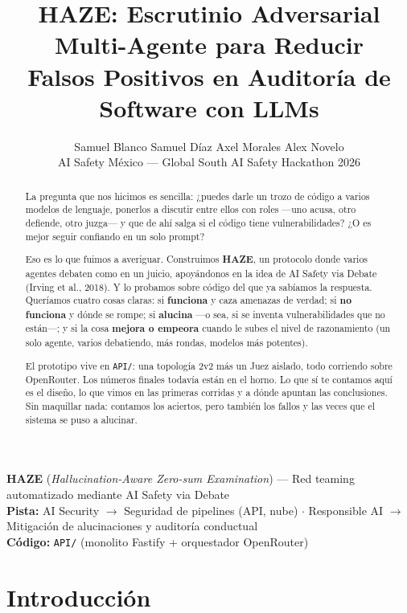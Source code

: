 \documentclass[10pt]{article}
\title{\textbf{HAZE: Escrutinio Adversarial Multi-Agente para Reducir\\
Falsos Positivos en Auditoría de Software con LLMs}}
\author{
  Samuel Blanco \quad Samuel Díaz \quad Axel Morales \quad Alex Novelo \\[0.3em]
  \small AI Safety México — Global South AI Safety Hackathon 2026
}
\date{}
\begin{document}
\maketitle

\begin{center}
\small
\textbf{HAZE} (\textit{Hallucination-Aware Zero-sum Examination}) --- Red teaming
automatizado mediante AI Safety via Debate\\[0.4em]
\textbf{Pista:} AI Security $\rightarrow$ Seguridad de pipelines (API, nube)
$\cdot$ Responsible AI $\rightarrow$ Mitigación de alucinaciones y auditoría
conductual\\[0.2em]
\textbf{Código:} \texttt{API/} (monolito Fastify + orquestador OpenRouter)
\end{center}

\vspace{0.5em}

\begin{abstract}
\noindent
La pregunta que nos hicimos es sencilla: ¿puedes darle un trozo de código a varios
modelos de lenguaje, ponerlos a discutir entre ellos con roles ---uno acusa, otro
defiende, otro juzga--- y que de ahí salga si el código tiene vulnerabilidades? ¿O es
mejor seguir confiando en un solo prompt?

Eso es lo que fuimos a averiguar. Construimos \textbf{HAZE}, un protocolo donde varios
agentes debaten como en un juicio, apoyándonos en la idea de AI Safety via Debate
(Irving et al., 2018). Y lo probamos sobre código del que ya sabíamos la respuesta.
Queríamos cuatro cosas claras: si \textbf{funciona} y caza amenazas de verdad; si
\textbf{no funciona} y dónde se rompe; si \textbf{alucina} ---o sea, si se inventa
vulnerabilidades que no están---; y si la cosa \textbf{mejora o empeora} cuando le subes
el nivel de razonamiento (un solo agente, varios debatiendo, más rondas, modelos más
potentes).

El prototipo vive en \texttt{API/}: una topología 2v2 más un Juez aislado, todo
corriendo sobre OpenRouter. Los números finales todavía están en el horno. Lo que sí te
contamos aquí es el diseño, lo que vimos en las primeras corridas y a dónde apuntan las
conclusiones. Sin maquillar nada: contamos los aciertos, pero también los fallos y las
veces que el sistema se puso a alucinar.
\end{abstract}

\section{Introducción}
\end{document}
